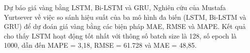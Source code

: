 Dự báo giá vàng bằng LSTM, Bi-LSTM và GRU, Nghiên cứu của Mustafa Yurtsever\cite{article5} về việc so sánh hiệu suất của ba mô hình đa biến (LSTM, Bi-LSTM và GRU) để dự đoán giá vàng bằng các biện pháp MAE, RMSE và MAPE. Kết quả cho thấy LSTM hoạt động tốt nhất với thông số batch size là 128, số epoch là 1000, dẫn đến MAPE = 3,18, RMSE = 61.728 và MAE = 48,85.